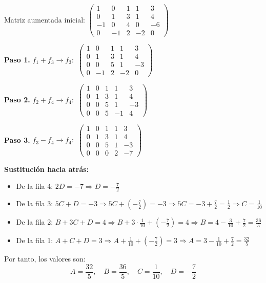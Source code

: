 \begin{prob}
\begin{myproof}
Matriz aumentada inicial:
$\left(\begin{array}{cccc|c}
1 & 0 & 1 & 1 & 3 \\
0 & 1 & 3 & 1 & 4 \\
-1 & 0 & 4 & 0 & -6 \\
0 & -1 & 2 & -2 & 0
\end{array}\right)$

\textbf{Paso 1.} $f_1 + f_3 \to f_3:$ $\left(\begin{array}{cccc|c}
1 & 0 & 1 & 1 & 3 \\
0 & 1 & 3 & 1 & 4 \\
0 & 0 & 5 & 1 & -3 \\
0 & -1 & 2 & -2 & 0
\end{array}\right)$

\textbf{Paso 2.} $f_2 + f_4 \to f_4:$  $\left(\begin{array}{cccc|c}
1 & 0 & 1 & 1 & 3 \\
0 & 1 & 3 & 1 & 4 \\
0 & 0 & 5 & 1 & -3 \\
0 & 0 & 5 & -1 & 4
\end{array}\right)$

\textbf{Paso 3.} $f_3 - f_4 \to f_4:$ $\left(\begin{array}{cccc|c}
1 & 0 & 1 & 1 & 3 \\
0 & 1 & 3 & 1 & 4 \\
0 & 0 & 5 & 1 & -3 \\
0 & 0 & 0 & 2 & -7
\end{array}\right)$

\textbf{Sustitución hacia atrás:}
\begin{itemize}
\item De la fila 4: $2D = -7 \Rightarrow D = -\frac{7}{2}$

\item De la fila 3: $5C + D = -3 \Rightarrow 5C + \left(-\frac{7}{2}\right) = -3 \Rightarrow 5C = -3 + \frac{7}{2} = \frac{1}{2} \Rightarrow C = \frac{1}{10}$

\item De la fila 2: $B + 3C + D = 4 \Rightarrow B + 3 \cdot \frac{1}{10} + \left(-\frac{7}{2}\right) = 4 \Rightarrow B = 4 - \frac{3}{10} + \frac{7}{2} = \frac{36}{5}$

\item De la fila 1: $A + C + D = 3 \Rightarrow A + \frac{1}{10} + \left(-\frac{7}{2}\right) = 3 \Rightarrow A = 3 - \frac{1}{10} + \frac{7}{2} = \frac{32}{5}$
\end{itemize}
Por tanto, los valores son:
$$A = \frac{32}{5}, \quad B = \frac{36}{5}, \quad C = \frac{1}{10}, \quad D = -\frac{7}{2}$$
\end{myproof}
\end{prob}
 



